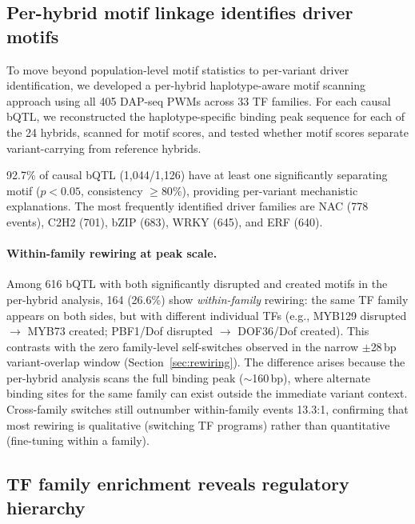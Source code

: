 \documentclass[11pt,a4paper]{article}
\begin{document}
\subsection{Per-hybrid motif linkage identifies driver motifs}
\label{sec:linkage}

To move beyond population-level motif statistics to per-variant driver
identification, we developed a per-hybrid haplotype-aware motif scanning
approach using all 405 DAP-seq PWMs across 33 TF families. For each causal
bQTL, we reconstructed the haplotype-specific binding peak sequence for each
of the 24 hybrids, scanned for motif scores, and tested whether motif scores
separate variant-carrying from reference hybrids.

92.7\% of causal bQTL (1,044/1,126) have at least one significantly separating
motif ($p < 0.05$, consistency $\geq 80\%$), providing per-variant mechanistic
explanations. The most frequently identified driver families are NAC (778
events), C2H2 (701), bZIP (683), WRKY (645), and ERF (640).

\paragraph{Within-family rewiring at peak scale.}
Among 616 bQTL with both significantly disrupted and created motifs in the
per-hybrid analysis, 164 (26.6\%) show \emph{within-family} rewiring: the
same TF family appears on both sides, but with different individual TFs
(e.g., MYB129 disrupted $\to$ MYB73 created; PBF1/Dof disrupted $\to$
DOF36/Dof created). This contrasts with the zero family-level self-switches
observed in the narrow $\pm$28\,bp variant-overlap window
(Section~\ref{sec:rewiring}). The difference arises because the per-hybrid
analysis scans the full binding peak (${\sim}$160\,bp), where alternate
binding sites for the same family can exist outside the immediate variant
context. Cross-family switches still outnumber within-family events 13.3:1,
confirming that most rewiring is qualitative (switching TF programs) rather
than quantitative (fine-tuning within a family).


\subsection{TF family enrichment reveals regulatory hierarchy}
\label{sec:enrichment}
\end{document}
